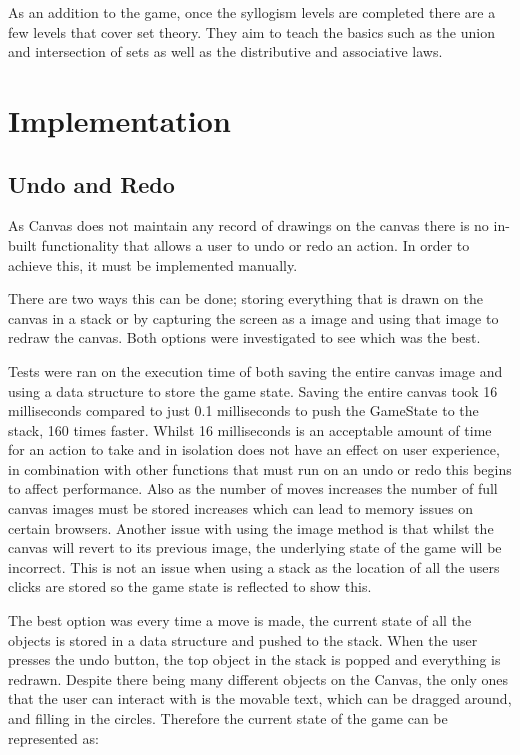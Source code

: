 \documentclass[12pt,a4paper]{report}
\begin{document}
As an addition to the game, once the syllogism levels are completed there are a few levels that cover set theory. They aim to teach the basics such as the union and intersection of sets as well as the distributive and associative laws. 



\chapter{Implementation}

\section{Undo and Redo}
As Canvas does not maintain any record of drawings on the canvas there is no in-built functionality that allows a user to undo or redo an action. In order to achieve this, it must be implemented manually.

There are two ways this can be done; storing everything that is drawn on the canvas in a stack or by capturing the screen as a image and using that image to redraw the canvas. Both options were investigated to see which was the best.

Tests were ran on the execution time of both saving the entire canvas image and using a data structure to store the game state. Saving the entire canvas took 16 milliseconds compared to just 0.1 milliseconds to push the GameState to the stack, 160 times faster. Whilst 16 milliseconds is an acceptable amount of time for an action to take and in isolation does not have an effect on user experience, in combination with other functions that must run on an undo or redo this begins to affect performance. Also as the number of moves increases the number of full canvas images must be stored increases which can lead to memory issues on certain browsers. Another issue with using the image method is that whilst the canvas will revert to its previous image, the underlying state of the game will be incorrect. This is not an issue when using a stack as the location of all the users clicks are stored so the game state is reflected to show this.

The best option was every time a move is made, the current state of all the objects is stored in a data structure and pushed to the stack. When the user presses the undo button, the top object in the stack is popped and everything is redrawn. Despite there being many different objects on the Canvas, the only ones that the user can interact with is the movable text, which can be dragged around, and filling in the circles. Therefore the current state of the game can be represented as:
\end{document}
